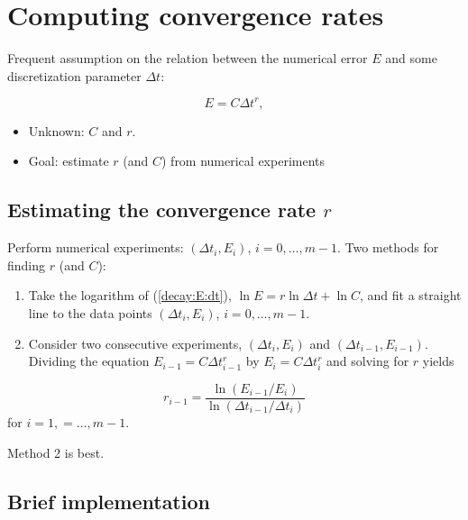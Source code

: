 \documentclass[%
oneside,                 %
final,                   %
10pt]{article}
\begin{document}
\section*{Computing convergence rates}
\label{decay:convrates}

Frequent assumption on the relation between the numerical error $E$ and
some discretization parameter $\Delta t$:

\begin{equation}
E = C\Delta t^r,
\label{decay:E:dt}
\end{equation}

\begin{itemize}
 \item Unknown: $C$ and $r$.

 \item Goal: estimate $r$ (and $C$) from numerical experiments
\end{itemize}

\noindent
\subsection*{Estimating the convergence rate $r$}

Perform numerical experiments: $(\Delta t_i, E_i)$, $i=0,\ldots,m-1$.
Two methods for finding $r$ (and $C$):

\begin{enumerate}
 \item Take the logarithm of (\ref{decay:E:dt}), $\ln E = r\ln \Delta t + \ln C$,
    and fit a straight line to the data points $(\Delta t_i, E_i)$,
    $i=0,\ldots,m-1$.

 \item Consider two consecutive experiments, $(\Delta t_i, E_i)$ and
    $(\Delta t_{i-1}, E_{i-1})$. Dividing the equation
    $E_{i-1}=C\Delta t_{i-1}^r$ by $E_{i}=C\Delta t_{i}^r$ and solving
    for $r$ yields
\end{enumerate}

\noindent
\begin{equation}
r_{i-1} = \frac{\ln (E_{i-1}/E_i)}{\ln (\Delta t_{i-1}/\Delta t_i)}
\label{decay:conv:rate}
\end{equation}
for $i=1,=\ldots,m-1$.

Method 2 is best.

\subsection*{Brief implementation}
\end{document}
